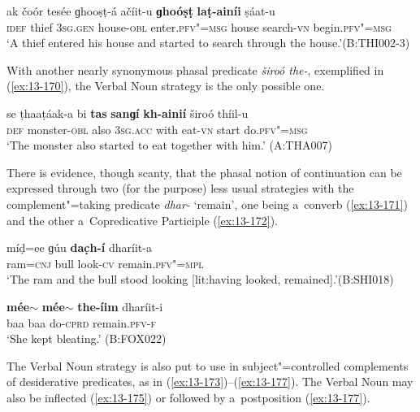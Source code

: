 \ea
\label{ex:13-169}
\gll ak čoór tesée ɡhooṣṭ-á ačíit-u \textbf{ɡhoóṣṭ} \textbf{laṭ-ainíi} ṣáat-u\\
\textsc{idef} thief \textsc{3sg.gen} house-\textsc{obl} enter.\textsc{pfv"=msg} house search-\textsc{vn} begin.\textsc{pfv"=msg}\\
\glt `A thief entered his house and started to search through the house.'\newline (B:THI002-3) 
\z

With another nearly synonymous phasal predicate \textit{široó the-}, exemplified in (\ref{ex:13-170}), the Verbal Noun strategy is the only possible one.

\begin{exe}
\ex
\label{ex:13-170}
\gll se ṭhaaṭáak-a bi \textbf{tas} \textbf{sanɡí} \textbf{kh-ainií}  široó thíil-u \\
\textsc{def} monster-\textsc{obl} also \textsc{3sg.acc} with eat-\textsc{vn} start do.\textsc{pfv"=msg} \\
\glt `The monster also started to eat together with him.' (A:THA007) 
\end{exe}

There is evidence, though scanty, that the phasal notion of continuation can be expressed through two (for the purpose) less usual strategies with the complement"=taking predicate \textit{dhar-} `remain', one being a~converb (\ref{ex:13-171}) and the other a~Copredicative Participle (\ref{ex:13-172}).

\begin{exe}
\ex
\label{ex:13-171}
\gll míḍ=ee ɡúu \textbf{dac̣h-í} dharíit-a \\
ram=\textsc{cnj} bull look-\textsc{cv} remain.\textsc{pfv"=mpl} \\
\glt `The ram and the bull stood  looking [lit:having looked, remained].'\newline (B:SHI018)

\ex
\label{ex:13-172}
\gll \textbf{mée$\sim$} \textbf{mée$\sim$} \textbf{the-íim} dharíit-i  \\
baa baa do-\textsc{cprd} remain.\textsc{pfv-f} \\
\glt `She kept bleating.' (B:FOX022) 
\end{exe}

 The Verbal Noun strategy is also put to use in
subject"=controlled complements of desiderative predicates, as in
(\ref{ex:13-173})--(\ref{ex:13-177}). The Verbal Noun may also be inflected
(\ref{ex:13-175}) or followed by
a~postposition (\ref{ex:13-177}).

